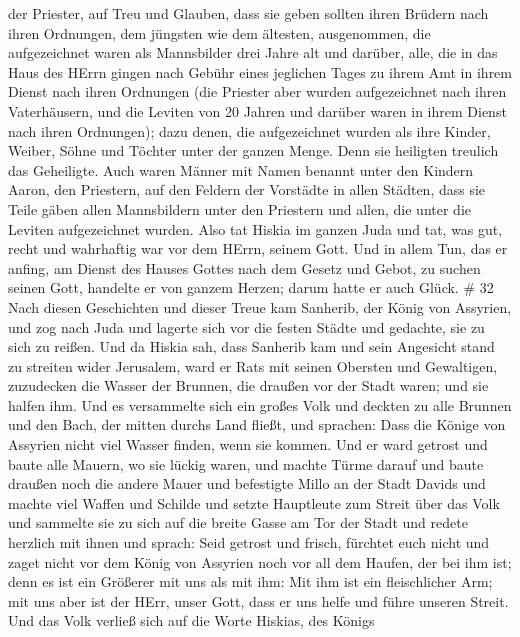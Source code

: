 der Priester, auf Treu und Glauben, dass sie geben sollten ihren Brüdern
nach ihren Ordnungen, dem jüngsten wie dem ältesten, 
ausgenommen, die aufgezeichnet waren als Mannsbilder drei Jahre alt und
darüber, alle, die in das Haus des HErrn gingen nach Gebühr eines
jeglichen Tages zu ihrem Amt in ihrem Dienst nach ihren Ordnungen
 (die Priester aber wurden aufgezeichnet nach ihren
Vaterhäusern, und die Leviten von 20 Jahren und darüber waren in ihrem
Dienst nach ihren Ordnungen);  dazu denen, die
aufgezeichnet wurden als ihre Kinder, Weiber, Söhne und Töchter unter
der ganzen Menge. Denn sie heiligten treulich das Geheiligte.
 Auch waren Männer mit Namen benannt unter den Kindern
Aaron, den Priestern, auf den Feldern der Vorstädte in allen Städten,
dass sie Teile gäben allen Mannsbildern unter den Priestern und allen,
die unter die Leviten aufgezeichnet wurden.  Also tat
Hiskia im ganzen Juda und tat, was gut, recht und wahrhaftig war vor dem
HErrn, seinem Gott.  Und in allem Tun, das er anfing, am
Dienst des Hauses Gottes nach dem Gesetz und Gebot, zu suchen seinen
Gott, handelte er von ganzem Herzen; darum hatte er auch Glück. \# 32
 Nach diesen Geschichten und dieser Treue kam Sanherib, der
König von Assyrien, und zog nach Juda und lagerte sich vor die festen
Städte und gedachte, sie zu sich zu reißen.  Und da Hiskia
sah, dass Sanherib kam und sein Angesicht stand zu streiten wider
Jerusalem,  ward er Rats mit seinen Obersten und Gewaltigen,
zuzudecken die Wasser der Brunnen, die draußen vor der Stadt waren; und
sie halfen ihm.  Und es versammelte sich ein großes Volk und
deckten zu alle Brunnen und den Bach, der mitten durchs Land fließt, und
sprachen: Dass die Könige von Assyrien nicht viel Wasser finden, wenn
sie kommen.  Und er ward getrost und baute alle Mauern, wo
sie lückig waren, und machte Türme darauf und baute draußen noch die
andere Mauer und befestigte Millo an der Stadt Davids und machte viel
Waffen und Schilde  und setzte Hauptleute zum Streit über
das Volk und sammelte sie zu sich auf die breite Gasse am Tor der Stadt
und redete herzlich mit ihnen und sprach:  Seid getrost und
frisch, fürchtet euch nicht und zaget nicht vor dem König von Assyrien
noch vor all dem Haufen, der bei ihm ist; denn es ist ein Größerer mit
uns als mit ihm:  Mit ihm ist ein fleischlicher Arm; mit uns
aber ist der HErr, unser Gott, dass er uns helfe und führe unseren
Streit. Und das Volk verließ sich auf die Worte Hiskias, des Königs
